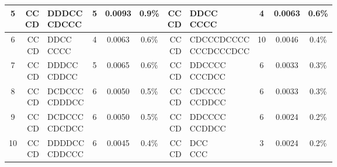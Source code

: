 \documentclass[9pt,twoside,lineno]{pnas-new}
\theoremstyle{plainCl1}
\theoremstyle{plainCl2}
\begin{document}
\begin{table}[t]
{\begin{tabular}{c|rlccc|rlccc}
    5  &  \cellcolor{gray!25} \makecell[r]{CC \\ CD} & \makecell[l]{  DDDCC \\    CDCCC} &  5 &  0.0093 & 0.9\%  &   \cellcolor{gray!25} \makecell[r]{CC \\ CD} & \makecell[l]{         DDCC \\          CCCC} &   4 &   0.0063 & 0.6\% \\ \hline
    6  &  \cellcolor{gray!25} \makecell[r]{CC \\ CD} & \makecell[l]{   DDCC \\     CCCC} &  4 &  0.0063 & 0.6\%  &   \cellcolor{gray!25} \makecell[r]{CC \\ CD} & \makecell[l]{   CDCCCDCCCC \\    CCCDCCCDCC} &  10 &   0.0046 & 0.4\% \\ \hline
    7  &  \cellcolor{gray!25} \makecell[r]{CC \\ CD} & \makecell[l]{  DDDCC \\    CDDCC} &  5 &  0.0065 & 0.6\%  &   \cellcolor{gray!25} \makecell[r]{CC \\ CD} & \makecell[l]{       DDCCCC \\        CCCDCC} &   6 &   0.0033 & 0.3\% \\ \hline
    8  &  \cellcolor{gray!25} \makecell[r]{CC \\ CD} & \makecell[l]{ DCDCCC \\   CDDDCC} &  6 &  0.0050 & 0.5\%  &   \cellcolor{gray!25} \makecell[r]{CC \\ CD} & \makecell[l]{       CDCCCC \\        CCDDCC} &   6 &   0.0033 & 0.3\% \\ \hline
    9  &  \cellcolor{gray!25} \makecell[r]{CC \\ CD} & \makecell[l]{ DCDCCC \\   CDCDCC} &  6 &  0.0050 & 0.5\%  &   \cellcolor{gray!25} \makecell[r]{CC \\ CD} & \makecell[l]{       DDCCCC \\        CCDDCC} &   6 &   0.0024 & 0.2\% \\ \hline
    10 &  \cellcolor{gray!25} \makecell[r]{CC \\ CD} & \makecell[l]{ DDDDCC \\   CDDCCC} &  6 &  0.0045 & 0.4\%  &   \cellcolor{gray!25} \makecell[r]{CC \\ CD} & \makecell[l]{          DCC \\           CCC} &   3 &   0.0024 & 0.2\% \\ \hline

\end{tabular}}
\end{table}
\end{document}
